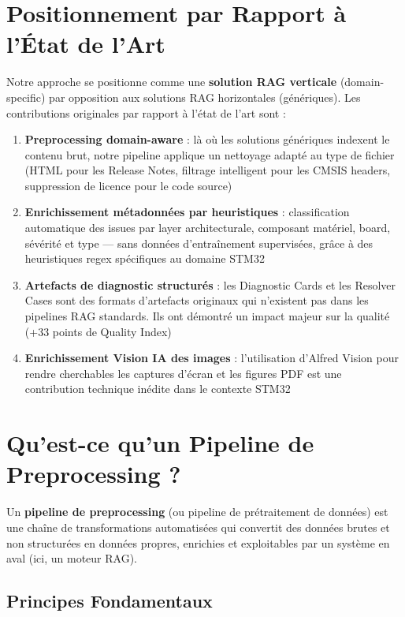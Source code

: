\documentclass[12pt,a4paper]{report}
\begin{document}
\section{Positionnement par Rapport à l'État de l'Art}
\label{sec:positionnement}

Notre approche se positionne comme une \textbf{solution RAG verticale} (domain-specific) par opposition aux solutions RAG horizontales (génériques). Les contributions originales par rapport à l'état de l'art sont :

\begin{enumerate}
  \item \textbf{Preprocessing domain-aware} : là où les solutions génériques indexent le contenu brut, notre pipeline applique un nettoyage adapté au type de fichier (HTML pour les Release Notes, filtrage intelligent pour les CMSIS headers, suppression de licence pour le code source)
  
  \item \textbf{Enrichissement métadonnées par heuristiques} : classification automatique des issues par layer architecturale, composant matériel, board, sévérité et type --- sans données d'entraînement supervisées, grâce à des heuristiques regex spécifiques au domaine STM32
  
  \item \textbf{Artefacts de diagnostic structurés} : les Diagnostic Cards et les Resolver Cases sont des formats d'artefacts originaux qui n'existent pas dans les pipelines RAG standards. Ils ont démontré un impact majeur sur la qualité (+33 points de Quality Index)
  
  \item \textbf{Enrichissement Vision IA des images} : l'utilisation d'Alfred Vision pour rendre cherchables les captures d'écran et les figures PDF est une contribution technique inédite dans le contexte STM32
\end{enumerate}

\section{Qu'est-ce qu'un Pipeline de Preprocessing ?}

Un \textbf{pipeline de preprocessing} (ou pipeline de prétraitement de données) est une chaîne de transformations automatisées qui convertit des données brutes et non structurées en données propres, enrichies et exploitables par un système en aval (ici, un moteur RAG).

\subsection{Principes Fondamentaux}
\end{document}
